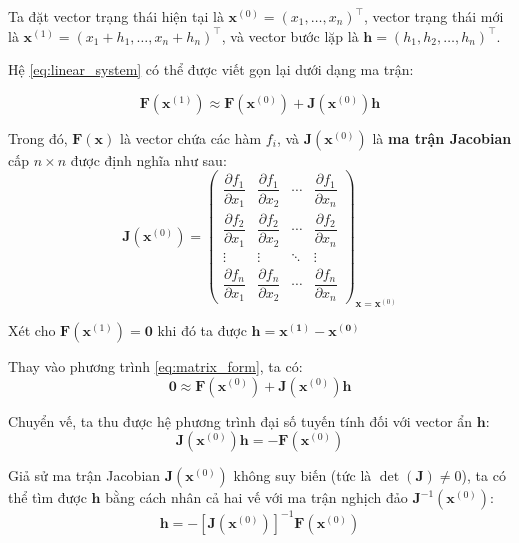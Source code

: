 Ta đặt vector trạng thái hiện tại là $\mathbf{x}^{(0)} = (x_1,\dots,x_n)^\top$, vector trạng thái mới là $\mathbf{x}^{(1)} = (x_1+h_1,\dots,x_n+h_n)^\top$, và vector bước lặp là $\mathbf{h} = (h_1, h_2, \dots, h_n)^\top$. 

Hệ \eqref{eq:linear_system} có thể được viết gọn lại dưới dạng ma trận:

\begin{equation}
    \mathbf{F}(\mathbf{x}^{(1)}) \approx \mathbf{F}(\mathbf{x}^{(0)}) + \mathbf{J}(\mathbf{x}^{(0)}) \mathbf{h}
    \label{eq:matrix_form}
\end{equation}

Trong đó, $\mathbf{F}(\mathbf{x})$ là vector chứa các hàm $f_i$, và $\mathbf{J}(\mathbf{x}^{(0)})$ là \textbf{ma trận Jacobian} cấp $n \times n$ được định nghĩa như sau:
\begin{equation}
    \mathbf{J}(\mathbf{x}^{(0)}) =
    \begin{pmatrix}
        \dfrac{\partial f_1}{\partial x_1} & \dfrac{\partial f_1}{\partial x_2} & \cdots & \dfrac{\partial f_1}{\partial x_n} \\[8pt]
        \dfrac{\partial f_2}{\partial x_1} & \dfrac{\partial f_2}{\partial x_2} & \cdots & \dfrac{\partial f_2}{\partial x_n} \\[4pt]
        \vdots & \vdots & \ddots & \vdots \\[4pt]
        \dfrac{\partial f_n}{\partial x_1} & \dfrac{\partial f_n}{\partial x_2} & \cdots & \dfrac{\partial f_n}{\partial x_n}
    \end{pmatrix}_{\!\mathbf{x} = \mathbf{x}^{(0)}}
    \label{eq:jacobian_def}
\end{equation}

Xét cho $\mathbf{F}(\mathbf{x}^{(1)}) = \mathbf{0}$ khi đó ta được $\mathbf{h = x^{(1)} - x^{(0)}} $

Thay vào phương trình \eqref{eq:matrix_form}, ta có:
\begin{equation}
    \mathbf{0} \approx \mathbf{F}(\mathbf{x}^{(0)}) + \mathbf{J}(\mathbf{x}^{(0)}) \mathbf{h}
\end{equation}

Chuyển vế, ta thu được hệ phương trình đại số tuyến tính đối với vector ẩn $\mathbf{h}$:
\begin{equation}
    \mathbf{J}(\mathbf{x}^{(0)}) \mathbf{h} = -\mathbf{F}(\mathbf{x}^{(0)})
    \label{eq:solve_h}
\end{equation}

Giả sử ma trận Jacobian $\mathbf{J}(\mathbf{x}^{(0)})$ không suy biến (tức là $\det(\mathbf{J}) \neq 0$), ta có thể tìm được $\mathbf{h}$ bằng cách nhân cả hai vế với ma trận nghịch đảo $\mathbf{J}^{-1}(\mathbf{x}^{(0)})$:
\begin{equation}
    \mathbf{h} = -[\mathbf{J}(\mathbf{x}^{(0)})]^{-1} \mathbf{F}(\mathbf{x}^{(0)})
\end{equation}

